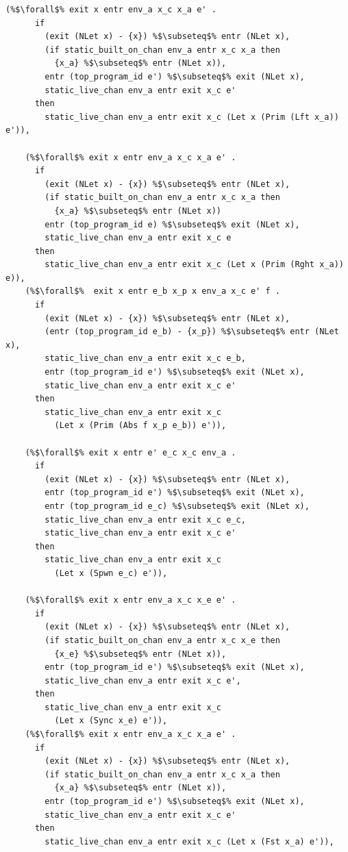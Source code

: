 \documentclass{article}
\begin{document}
\begin{lstlisting}[language=logic, escapechar=\%]
    (%$\forall$% exit x entr env_a x_c x_a e' . 
      if
        (exit (NLet x) - {x}) %$\subseteq$% entr (NLet x),
        (if static_built_on_chan env_a entr x_c x_a then
          {x_a} %$\subseteq$% entr (NLet x)),
        entr (top_program_id e') %$\subseteq$% exit (NLet x),
        static_live_chan env_a entr exit x_c e'
      then
        static_live_chan env_a entr exit x_c (Let x (Prim (Lft x_a)) e')),

    (%$\forall$% exit x entr env_a x_c x_a e' . 
      if
        (exit (NLet x) - {x}) %$\subseteq$% entr (NLet x),
        (if static_built_on_chan env_a entr x_c x_a then
          {x_a} %$\subseteq$% entr (NLet x))
        entr (top_program_id e) %$\subseteq$% exit (NLet x),
        static_live_chan env_a entr exit x_c e
      then
        static_live_chan env_a entr exit x_c (Let x (Prim (Rght x_a)) e)),
    (%$\forall$%  exit x entr e_b x_p x env_a x_c e' f . 
      if
        (exit (NLet x) - {x}) %$\subseteq$% entr (NLet x),
        (entr (top_program_id e_b) - {x_p}) %$\subseteq$% entr (NLet x),
        static_live_chan env_a entr exit x_c e_b,
        entr (top_program_id e') %$\subseteq$% exit (NLet x),
        static_live_chan env_a entr exit x_c e'
      then
        static_live_chan env_a entr exit x_c
          (Let x (Prim (Abs f x_p e_b)) e')),

    (%$\forall$% exit x entr e' e_c x_c env_a .
      if
        (exit (NLet x) - {x}) %$\subseteq$% entr (NLet x),
        entr (top_program_id e') %$\subseteq$% exit (NLet x),
        entr (top_program_id e_c) %$\subseteq$% exit (NLet x),
        static_live_chan env_a entr exit x_c e_c,
        static_live_chan env_a entr exit x_c e'
      then
        static_live_chan env_a entr exit x_c
          (Let x (Spwn e_c) e')),

    (%$\forall$% exit x entr env_a x_c x_e e' .
      if
        (exit (NLet x) - {x}) %$\subseteq$% entr (NLet x),
        (if static_built_on_chan env_a entr x_c x_e then
          {x_e} %$\subseteq$% entr (NLet x)),
        entr (top_program_id e') %$\subseteq$% exit (NLet x),
        static_live_chan env_a entr exit x_c e',
      then
        static_live_chan env_a entr exit x_c
          (Let x (Sync x_e) e')),
    (%$\forall$% exit x entr env_a x_c x_a e' .
      if
        (exit (NLet x) - {x}) %$\subseteq$% entr (NLet x),
        (if static_built_on_chan env_a entr x_c x_a then
          {x_a} %$\subseteq$% entr (NLet x)),
        entr (top_program_id e') %$\subseteq$% exit (NLet x),
        static_live_chan env_a entr exit x_c e'
      then
        static_live_chan env_a entr exit x_c (Let x (Fst x_a) e')),


\end{lstlisting}
\end{document}
